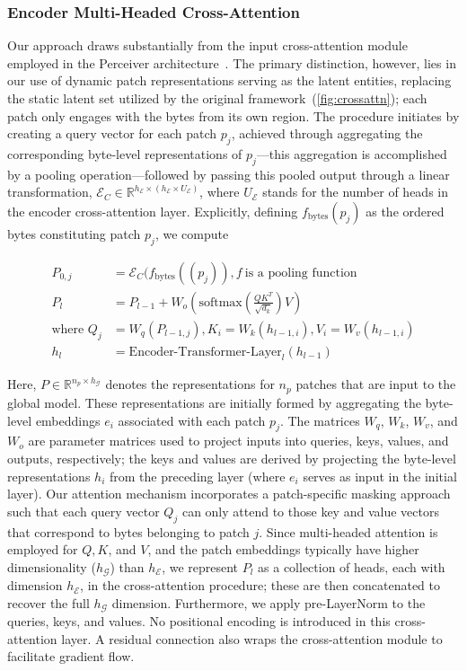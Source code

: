 \subsubsection{Encoder Multi-Headed Cross-Attention}
\label{sec:enc-cross-attn}
Our approach draws substantially from the input cross-attention module employed in the Perceiver architecture~\citep{jaegle2021perceiver}. The primary distinction, however, lies in our use of dynamic patch representations serving as the latent entities, replacing the static latent set utilized by the original framework~(\autoref{fig:crossattn}); each patch only engages with the bytes from its own region. The procedure initiates by creating a query vector for each patch $p_j$, achieved through aggregating the corresponding byte-level representations of $p_j$—this aggregation is accomplished by a pooling operation—followed by passing this pooled output through a linear transformation, $\mathcal{E}_{C} \in \mathbb{R}^{h_{\mathcal{E}} \times (h_{\mathcal{E}} \times U_{\mathcal{E}})}$, where $U_{\mathcal{E}}$ stands for the number of heads in the encoder cross-attention layer. Explicitly, defining $f_{\text{bytes}}(p_j)$ as the ordered bytes constituting patch $p_j$, we compute

\begin{align}
P_{0,j} &= \mathcal{E}_{C}(f_\text{bytes}((p_j)), f~ \text{is a pooling function} \\
P_l &= P_{l-1} + W_o\left(\text{softmax}\left(\frac{QK^T}{\sqrt{d_k}}\right)V\right) \\
\text{where } Q_j &= W_q(P_{l-1,j}), K_i = W_k(h_{l-1,i}), V_i = W_v(h_{l-1,i}) \\
h_l &= \text{Encoder-Transformer-Layer}_l(h_{l-1})
\end{align}

Here, $P \in \mathbb{R}^{n_p \times h_{\mathcal{G}}}$ denotes the representations for $n_p$ patches that are input to the global model. These representations are initially formed by aggregating the byte-level embeddings $e_i$ associated with each patch $p_j$. The matrices $W_q$, $W_k$, $W_v$, and $W_o$ are parameter matrices used to project inputs into queries, keys, values, and outputs, respectively; the keys and values are derived by projecting the byte-level representations $h_i$ from the preceding layer (where $e_i$ serves as input in the initial layer). Our attention mechanism incorporates a patch-specific masking approach such that each query vector $Q_j$ can only attend to those key and value vectors that correspond to bytes belonging to patch $j$. Since multi-headed attention is employed for $Q, K$, and $V$, and the patch embeddings typically have higher dimensionality ($h_{\mathcal{G}}$) than $h_{\mathcal{E}}$, we represent $P_l$ as a collection of heads, each with dimension $h_{\mathcal{E}}$, in the cross-attention procedure; these are then concatenated to recover the full $h_{\mathcal{G}}$ dimension. Furthermore, we apply pre-LayerNorm to the queries, keys, and values. No positional encoding is introduced in this cross-attention layer. A residual connection also wraps the cross-attention module to facilitate gradient flow.

